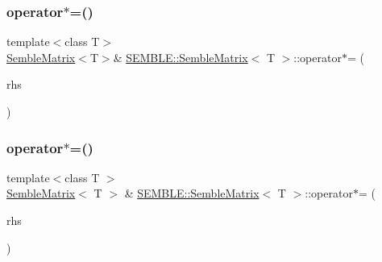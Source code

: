 \mbox{\label{structSEMBLE_1_1SembleMatrix_ac332d2c0b52d2727a4159a7a876d7e39}} 
\subsubsection{\texorpdfstring{operator$\ast$=()}{operator*=()}\hspace{0.1cm}{\footnotesize\ttfamily [2/10]}}
{\footnotesize\ttfamily template$<$class T$>$ \\
\mbox{\hyperlink{structSEMBLE_1_1SembleMatrix}{Semble\+Matrix}}$<$T$>$\& \mbox{\hyperlink{structSEMBLE_1_1SembleMatrix}{S\+E\+M\+B\+L\+E\+::\+Semble\+Matrix}}$<$ T $>$\+::operator$\ast$= (\begin{DoxyParamCaption}\item[{const T \&}]{rhs }\end{DoxyParamCaption})}

\mbox{\label{structSEMBLE_1_1SembleMatrix_a9da9280a327b75bb2a7d58080ef6aa59}} 
\subsubsection{\texorpdfstring{operator$\ast$=()}{operator*=()}\hspace{0.1cm}{\footnotesize\ttfamily [3/10]}}
{\footnotesize\ttfamily template$<$class T $>$ \\
\mbox{\hyperlink{structSEMBLE_1_1SembleMatrix}{Semble\+Matrix}}$<$ T $>$ \& \mbox{\hyperlink{structSEMBLE_1_1SembleMatrix}{S\+E\+M\+B\+L\+E\+::\+Semble\+Matrix}}$<$ T $>$\+::operator$\ast$= (\begin{DoxyParamCaption}\item[{const typename \mbox{\hyperlink{structSEMBLE_1_1PromoteScalar}{Promote\+Scalar}}$<$ T $>$\+::Type \&}]{rhs }\end{DoxyParamCaption})}

